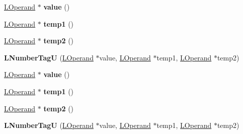 \begin{DoxyCompactItemize}
\item 
\hyperlink{classv8_1_1internal_1_1_l_operand}{L\+Operand} $\ast$ {\bfseries value} ()\hypertarget{classv8_1_1internal_1_1_l_number_tag_u_a250600d81f63976f70111c5b90a2a5c3}{}\label{classv8_1_1internal_1_1_l_number_tag_u_a250600d81f63976f70111c5b90a2a5c3}

\item 
\hyperlink{classv8_1_1internal_1_1_l_operand}{L\+Operand} $\ast$ {\bfseries temp1} ()\hypertarget{classv8_1_1internal_1_1_l_number_tag_u_af1b9a9050ae593071ec641d8db810594}{}\label{classv8_1_1internal_1_1_l_number_tag_u_af1b9a9050ae593071ec641d8db810594}

\item 
\hyperlink{classv8_1_1internal_1_1_l_operand}{L\+Operand} $\ast$ {\bfseries temp2} ()\hypertarget{classv8_1_1internal_1_1_l_number_tag_u_afac0fd287b623c724001aee50155b71c}{}\label{classv8_1_1internal_1_1_l_number_tag_u_afac0fd287b623c724001aee50155b71c}

\item 
{\bfseries L\+Number\+TagU} (\hyperlink{classv8_1_1internal_1_1_l_operand}{L\+Operand} $\ast$value, \hyperlink{classv8_1_1internal_1_1_l_operand}{L\+Operand} $\ast$temp1, \hyperlink{classv8_1_1internal_1_1_l_operand}{L\+Operand} $\ast$temp2)\hypertarget{classv8_1_1internal_1_1_l_number_tag_u_a29c2cbf4352a712caccdaed62fc601d7}{}\label{classv8_1_1internal_1_1_l_number_tag_u_a29c2cbf4352a712caccdaed62fc601d7}

\item 
\hyperlink{classv8_1_1internal_1_1_l_operand}{L\+Operand} $\ast$ {\bfseries value} ()\hypertarget{classv8_1_1internal_1_1_l_number_tag_u_a250600d81f63976f70111c5b90a2a5c3}{}\label{classv8_1_1internal_1_1_l_number_tag_u_a250600d81f63976f70111c5b90a2a5c3}

\item 
\hyperlink{classv8_1_1internal_1_1_l_operand}{L\+Operand} $\ast$ {\bfseries temp1} ()\hypertarget{classv8_1_1internal_1_1_l_number_tag_u_af1b9a9050ae593071ec641d8db810594}{}\label{classv8_1_1internal_1_1_l_number_tag_u_af1b9a9050ae593071ec641d8db810594}

\item 
\hyperlink{classv8_1_1internal_1_1_l_operand}{L\+Operand} $\ast$ {\bfseries temp2} ()\hypertarget{classv8_1_1internal_1_1_l_number_tag_u_afac0fd287b623c724001aee50155b71c}{}\label{classv8_1_1internal_1_1_l_number_tag_u_afac0fd287b623c724001aee50155b71c}

\item 
{\bfseries L\+Number\+TagU} (\hyperlink{classv8_1_1internal_1_1_l_operand}{L\+Operand} $\ast$value, \hyperlink{classv8_1_1internal_1_1_l_operand}{L\+Operand} $\ast$temp1, \hyperlink{classv8_1_1internal_1_1_l_operand}{L\+Operand} $\ast$temp2)\hypertarget{classv8_1_1internal_1_1_l_number_tag_u_a29c2cbf4352a712caccdaed62fc601d7}{}\label{classv8_1_1internal_1_1_l_number_tag_u_a29c2cbf4352a712caccdaed62fc601d7}


\end{DoxyCompactItemize}

